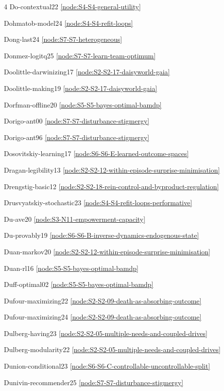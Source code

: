 \documentclass[10pt]{article}
\begin{document}
{\begin{multicols}{4}
Do-contextual22 \hfill \ref{node:S4-S4-general-utility}\par
Dohmatob-model24 \hfill \ref{node:S4-S4-refit-loops}\par
Dong-last24 \hfill \ref{node:S7-S7-heterogeneous}\par
Donmez-logitq25 \hfill \ref{node:S7-S7-learn-team-optimum}\par
Doolittle-darwinizing17 \hfill \ref{node:S2-S2-17-daisyworld-gaia}\par
Doolittle-making19 \hfill \ref{node:S2-S2-17-daisyworld-gaia}\par
Dorfman-offline20 \hfill \ref{node:S5-S5-bayes-optimal-bamdp}\par
Dorigo-ant00 \hfill \ref{node:S7-S7-disturbance-stigmergy}\par
Dorigo-ant96 \hfill \ref{node:S7-S7-disturbance-stigmergy}\par
Dosovitskiy-learning17 \hfill \ref{node:S6-S6-E-learned-outcome-spaces}\par
Dragan-legibility13 \hfill \ref{node:S2-S2-12-within-episode-surprise-minimisation}\par
Drengstig-basic12 \hfill \ref{node:S2-S2-18-rein-control-and-byproduct-regulation}\par
Drusvyatskiy-stochastic23 \hfill \ref{node:S4-S4-refit-loops-performative}\par
Du-ave20 \hfill \ref{node:S3-N11-empowerment-capacity}\par
Du-provably19 \hfill \ref{node:S6-S6-B-inverse-dynamics-endogenous-state}\par
Duan-markov20 \hfill \ref{node:S2-S2-12-within-episode-surprise-minimisation}\par
Duan-rl16 \hfill \ref{node:S5-S5-bayes-optimal-bamdp}\par
Duff-optimal02 \hfill \ref{node:S5-S5-bayes-optimal-bamdp}\par
Dufour-maximizing22 \hfill \ref{node:S2-S2-09-death-as-absorbing-outcome}\par
Dufour-maximizing24 \hfill \ref{node:S2-S2-09-death-as-absorbing-outcome}\par
Dulberg-having23 \hfill \ref{node:S2-S2-05-multiple-needs-and-coupled-drives}\par
Dulberg-modularity22 \hfill \ref{node:S2-S2-05-multiple-needs-and-coupled-drives}\par
Dunion-conditional23 \hfill \ref{node:S6-S6-C-controllable-uncontrollable-split}\par
Dunivin-recommender25 \hfill \ref{node:S7-S7-disturbance-stigmergy}\par

\end{multicols}}
\end{document}
